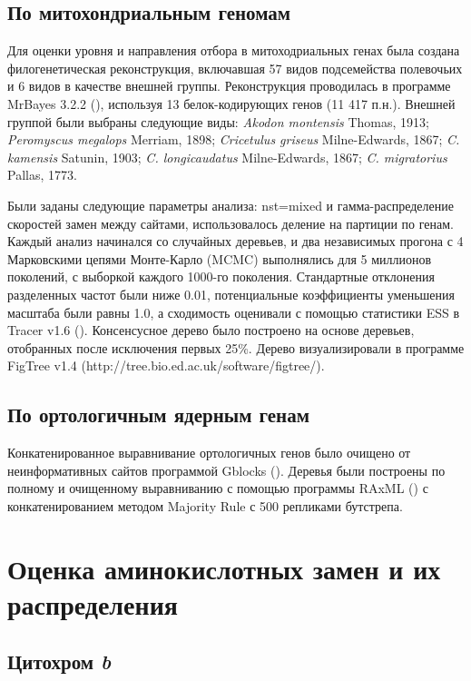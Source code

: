 \subsection{По митохондриальным геномам}
Для оценки уровня и направления отбора в митоходриальных генах была создана филогенетическая реконструкция, включавшая 57 видов подсемейства полевочьих и 6 видов в качестве внешней группы. Реконструкция проводилась в программе MrBayes 3.2.2 (\cite{Ronquist2012}), используя 13 белок-кодирующих генов (11 417 п.н.). Внешней группой были выбраны следующие виды: \textit{Akodon montensis} Thomas, 1913; \textit{Peromyscus megalops} Merriam, 1898; \textit{Cricetulus griseus} Milne-Edwards, 1867; \textit{C. kamensis} Satunin, 1903; \textit{C. longicaudatus} Milne-Edwards, 1867; \textit{C. migratorius} Pallas, 1773.
 
Были заданы следующие параметры анализа: nst=mixed и гамма-распределение скоростей замен между сайтами, использовалось деление на партиции по генам. Каждый анализ начинался со случайных деревьев, и два независимых прогона с 4 Марковскими цепями Монте-Карло (MCMC) выполнялись для 5 миллионов поколений, с выборкой каждого 1000-го поколения. Стандартные отклонения разделенных частот были ниже 0.01, потенциальные коэффициенты уменьшения масштаба были равны 1.0, а сходимость оценивали с помощью статистики ESS в Tracer v1.6 (\cite{Rambaut2014}). Консенсусное дерево было построено на основе деревьев, отобранных после исключения первых 25\%. Дерево визуализировали в программе FigTree v1.4 (http://tree.bio.ed.ac.uk/software/figtree/).

\subsection{По ортологичным ядерным генам}

Конкатенированное выравнивание ортологичных генов было очищено от неинформативных сайтов программой Gblocks (\cite{Castresana2000}). Деревья были построены по полному и очищенному выравниванию с помощью программы RAxML (\cite{Stamatakis2014}) с конкатенированием методом Majority Rule с 500 репликами бутстрепа. 

\section{Оценка аминокислотных замен и их распределения}

\subsection{Цитохром \textit{b}}

